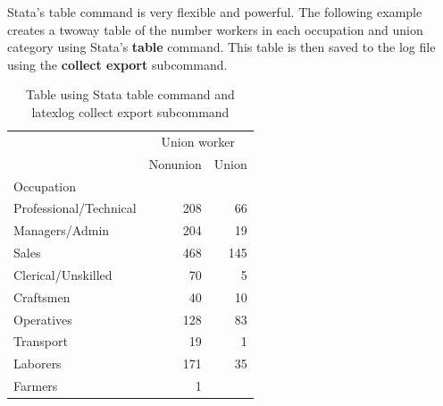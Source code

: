 \documentclass{article}
\begin{document}
\vspace{10pt}
Stata's table command is very flexible and powerful. 
The following example creates a twoway table of the number workers in each occupation and union category 
using Stata's \textbf{table} command. 
This table is then saved to the log file using the \textbf{collect export} subcommand.
\begin{table}[htbp] 
\centering 
\begin{threeparttable} 
\caption{Table using Stata table command and latexlog collect export subcommand} 

\centering
\begin{tabular}{lll}
\toprule
\multicolumn{1}{c}{} &
  \multicolumn{2}{c}{Union worker} \\
\multicolumn{1}{c}{} &
  \multicolumn{1}{r}{Nonunion} &
  \multicolumn{1}{r}{Union} \\
\midrule
\multicolumn{1}{l}{Occupation} &
  \multicolumn{1}{r}{} &
  \multicolumn{1}{r}{} \\
\multicolumn{1}{l}{\hspace{1em}Professional/Technical} &
  \multicolumn{1}{r}{208} &
  \multicolumn{1}{r}{66} \\
\multicolumn{1}{l}{\hspace{1em}Managers/Admin} &
  \multicolumn{1}{r}{204} &
  \multicolumn{1}{r}{19} \\
\multicolumn{1}{l}{\hspace{1em}Sales} &
  \multicolumn{1}{r}{468} &
  \multicolumn{1}{r}{145} \\
\multicolumn{1}{l}{\hspace{1em}Clerical/Unskilled} &
  \multicolumn{1}{r}{70} &
  \multicolumn{1}{r}{5} \\
\multicolumn{1}{l}{\hspace{1em}Craftsmen} &
  \multicolumn{1}{r}{40} &
  \multicolumn{1}{r}{10} \\
\multicolumn{1}{l}{\hspace{1em}Operatives} &
  \multicolumn{1}{r}{128} &
  \multicolumn{1}{r}{83} \\
\multicolumn{1}{l}{\hspace{1em}Transport} &
  \multicolumn{1}{r}{19} &
  \multicolumn{1}{r}{1} \\
\multicolumn{1}{l}{\hspace{1em}Laborers} &
  \multicolumn{1}{r}{171} &
  \multicolumn{1}{r}{35} \\
\multicolumn{1}{l}{\hspace{1em}Farmers} &
  \multicolumn{1}{r}{1} &

\end{tabular}
\end{threeparttable}
\end{table}
\end{document}

